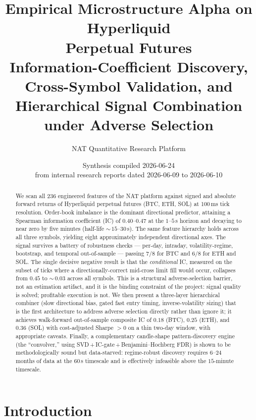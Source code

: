 \documentclass[11pt]{article}
\title{\textbf{Empirical Microstructure Alpha on Hyperliquid\\ Perpetual Futures}\\[4pt]
\large Information-Coefficient Discovery, Cross-Symbol Validation, and\\
Hierarchical Signal Combination under Adverse Selection}
\author{NAT Quantitative Research Platform}
\date{Synthesis compiled 2026-06-24\\
\small{from internal research reports dated 2026-06-09 to 2026-06-10}}
\newcommand{\ic}{\textnormal{IC}}
\begin{document}
\maketitle

\begin{abstract}
\noindent
We scan all 236 engineered features of the NAT platform against signed and absolute
forward returns of Hyperliquid perpetual futures (BTC, ETH, SOL) at 100\,ms tick
resolution. Order-book imbalance is the dominant directional predictor, attaining a
Spearman information coefficient (\ic) of $0.40$--$0.47$ at the $1$--$5\,$s horizon and
decaying to near zero by five minutes (half-life $\sim$\,$15$--$30\,$s). The same feature
hierarchy holds across all three symbols, yielding eight approximately independent
directional axes. The signal survives a battery of robustness checks --- per-day,
intraday, volatility-regime, bootstrap, and temporal out-of-sample --- passing $7/8$
for BTC and $6/8$ for ETH and SOL. The single decisive negative result is that the
\emph{conditional} \ic, measured on the subset of ticks where a directionally-correct
mid-cross limit fill would occur, collapses from $0.45$ to $\sim$\,$0.03$ across all
symbols. This is a structural adverse-selection barrier, not an estimation artifact, and
it is the binding constraint of the project: signal quality is solved; profitable
execution is not. We then present a three-layer hierarchical combiner (slow directional
bias, gated fast entry timing, inverse-volatility sizing) that is the first architecture
to address adverse selection directly rather than ignore it; it achieves walk-forward
out-of-sample composite \ic{} of $0.18$ (BTC), $0.25$ (ETH), and $0.36$ (SOL) with
cost-adjusted Sharpe $> 0$ on a thin two-day window, with appropriate caveats. Finally,
a complementary candle-shape pattern-discovery engine (the ``convolver,'' using
SVD\,+\,IC-gate\,+\,Benjamini--Hochberg FDR) is shown to be methodologically sound but
data-starved: regime-robust discovery requires $6$--$24$ months of data at the $60\,$s
timescale and is effectively infeasible above the $15$-minute timescale.
\end{abstract}

\tableofcontents
\bigskip

\section{Introduction}
\end{document}
